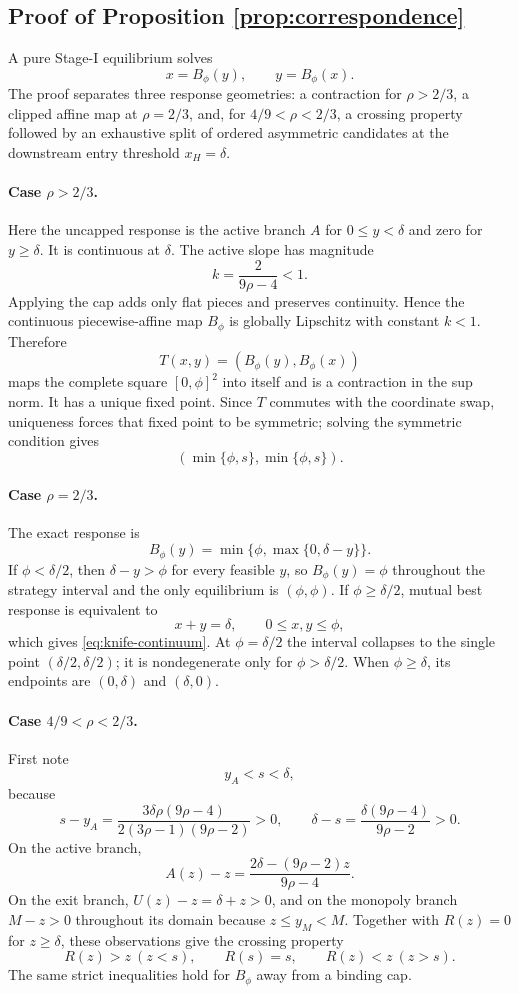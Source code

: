 \subsection{Proof of Proposition \ref{prop:correspondence}}

A pure Stage-I equilibrium solves
\[
x=B_\phi(y),\qquad y=B_\phi(x).
\]
The proof separates three response geometries: a contraction for
\(\rho>2/3\), a clipped affine map at \(\rho=2/3\), and, for
\(4/9<\rho<2/3\), a crossing property followed by an exhaustive split of
ordered asymmetric candidates at the downstream entry threshold
\(x_H=\delta\).

\paragraph{Case \(\rho>2/3\).}
Here the uncapped response is the active branch \(A\) for
\(0\le y<\delta\) and zero for \(y\ge\delta\).  It is continuous at
\(\delta\).  The active slope has magnitude
\[
k=\frac{2}{9\rho-4}<1.
\]
Applying the cap adds only flat pieces and preserves continuity.  Hence the
continuous piecewise-affine map \(B_\phi\) is globally Lipschitz with
constant \(k<1\).  Therefore
\[
T(x,y)=(B_\phi(y),B_\phi(x))
\]
maps the complete square \([0,\phi]^2\) into itself and is a contraction in
the sup norm.  It has a unique fixed point.  Since \(T\) commutes with the
coordinate swap, uniqueness forces that fixed point to be symmetric; solving
the symmetric condition gives
\[
(\min\{\phi,s\},\min\{\phi,s\}).
\]

\paragraph{Case \(\rho=2/3\).}
The exact response is
\[
B_\phi(y)=\min\{\phi,\max\{0,\delta-y\}\}.
\]
If \(\phi<\delta/2\), then \(\delta-y>\phi\) for every feasible
\(y\), so \(B_\phi(y)=\phi\) throughout the strategy interval and the
only equilibrium is \((\phi,\phi)\).  If \(\phi\ge\delta/2\), mutual
best response is equivalent to
\[
x+y=\delta,\qquad 0\le x,y\le\phi,
\]
which gives \eqref{eq:knife-continuum}.  At
\(\phi=\delta/2\) the interval collapses to the single point
\((\delta/2,\delta/2)\); it is nondegenerate only for
\(\phi>\delta/2\).  When \(\phi\ge\delta\), its endpoints are
\((0,\delta)\) and \((\delta,0)\).

\paragraph{Case \(4/9<\rho<2/3\).}
First note
\[
y_A<s<\delta,
\]
because
\[
s-y_A
=
\frac{3\delta\rho(9\rho-4)}
{2(3\rho-1)(9\rho-2)}
>0,
\qquad
\delta-s
=
\frac{\delta(9\rho-4)}{9\rho-2}
>0.
\]
On the active branch,
\[
A(z)-z
=
\frac{2\delta-(9\rho-2)z}{9\rho-4}.
\]
On the exit branch, \(U(z)-z=\delta+z>0\), and on the monopoly branch
\(M-z>0\) throughout its domain because \(z\le y_M<M\).  Together with
\(R(z)=0\) for \(z\ge\delta\), these observations give the crossing
property
\[
R(z)>z\ (z<s),\qquad
R(s)=s,\qquad
R(z)<z\ (z>s).
\]
The same strict inequalities hold for \(B_\phi\) away from a binding cap.

